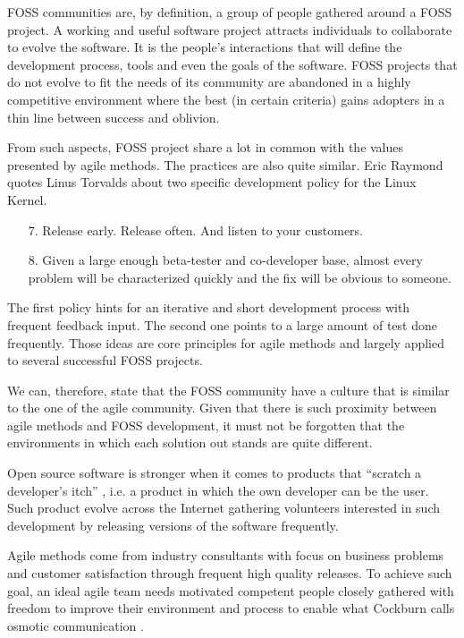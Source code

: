\documentclass[lnbip]{svmultln}
\begin{document}
FOSS communities are, by definition, a group of people gathered around
a FOSS project. A working and useful software project attracts
individuals to collaborate to evolve the
software\cite{crowston2002}. It is the people's interactions that will
define the development process, tools and even the goals of the
software. FOSS projects that do not evolve to fit the needs of its
community are abandoned in a highly competitive environment where the
best (in certain criteria) gains adopters in a thin line between
success and oblivion.

From such aspects, FOSS project share a lot in common with the values
presented by agile methods. The practices are also quite similar. Eric
Raymond quotes Linus Torvalds about two specific development policy
for the Linux Kernel.
\begin{enumerate}
\item[7.] Release early. Release often. And listen to your customers.
\item[8.] Given a large enough beta-tester and co-developer base,
  almost every problem will be characterized quickly and the fix will
  be obvious to someone.
\end{enumerate}

The first policy hints for an iterative and short development process
with frequent feedback input. The second one points to a large amount
of test done frequently. Those ideas are core principles for agile
methods and largely applied to several successful FOSS projects.

We can, therefore, state that the FOSS community have a culture that
is similar to the one of the agile community. Given that there is such
proximity between agile methods and FOSS development, it must not be
forgotten that the environments in which each solution out stands are
quite different.

Open source software is stronger when it comes to products that
``scratch a developer's itch'' \cite{fitzgerald2000}, i.e. a product
in which the own developer can be the user. Such product evolve across
the Internet gathering volunteers interested in such development by
releasing versions of the software frequently.

Agile methods come from industry consultants with focus on business
problems and customer satisfaction through frequent high quality
releases. To achieve such goal, an ideal agile team needs motivated
competent people closely gathered with freedom to improve their
environment and process to enable what Cockburn calls osmotic
communication \cite{cockburn2004}.
\end{document}
